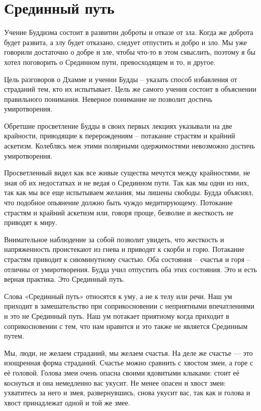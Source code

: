 \chapter{Срединный путь}

Учение Буддизма состоит в развитии доброты и отказе от зла. Когда же доброта будет развита, а злу будет отказано, следует отпустить и добро и зло. Мы уже говорили достаточно о добре и зле, чтобы что-то в этом смыслить, поэтому я бы хотел поговорить о Срединном пути, превосходящем и то, и другое.

Цель разговоров о Дхамме и учении Будды – указать способ избавления от страданий тем, кто их испытывает. Цель же самого учения состоит в объяснении правильного понимания. Неверное понимание не позволит достичь умиротворения.

Обретшие просветление Будды в своих первых лекциях указывали на две крайности, приводящие к перерождениям – потакание страстям и крайний аскетизм. Колеблясь меж этими полярными одержимостями невозможно достичь умиротворения.

Просветленный видел как все живые существа мечутся между крайностями, не зная об их недостатках и не ведая о  Срединном пути. Так как мы одни из них, так как мы все еще испытываем желания, мы лишены свободы. Будда объяснял, что подобное опьянение должно быть чуждо медитирующему. Потокание страстям и крайний аскетизм или, говоря проще, безволие и жесткость не приводят к миру.

Внимательное наблюдение за собой позволит увидеть, что жесткость и напряженность проистекают из гнева и приводят к скорби и горю. Потакание страстям приводит к сиюминутному счастью. Оба состояния – счастья и горя – отличны от умиротворения. Будда учил отпустить оба этих состояния. Это и есть верная практика. Это Срединный путь.

Слова «Срединный путь» относятся к уму, а не к телу или речи. Наш ум приходит в замешательство при соприкосновении с неприятными впечатлениями и это не Срединный путь. Наш ум потакает приятному когда приходит в соприкосновении с тем, что нам нравится и это также не является Срединным путем.

Мы, люди, не желаем страданий, мы желаем счастья. На деле же счастье — это изощренная форма страданий. Счастье можно сравнить с хвостом змеи, а горе с её головой. Голова змеи очень опасна своими ядовитыми клыками: стоит её коснуться и она немедленно вас укусит. Не менее опасен и хвост змеи: ухватитесь за него и змея, развернувшись, снова укусит вас, так как и голова и хвост принадлежат одной и той же змее.

